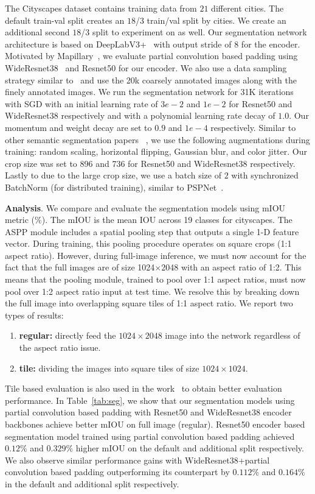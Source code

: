\documentclass[10pt,twocolumn,letterpaper]{article}
\begin{document}
The Cityscapes dataset contains training data from $21$ different cities. The default train-val split creates an $18$/$3$ train/val split by cities. We create an additional second $18$/$3$ split to experiment on as well. Our segmentation network architecture is based on DeepLabV3+~\cite{chen2018encoder} with output stride of $8$ for the encoder. Motivated by Mapillary~\cite{bulo2017place}, we evaluate partial convolution based padding using WideResnet38~\cite{wu2016wider} and Resnet50 for our encoder. We also use a data sampling strategy similar to~\cite{bulo2017place} and use the 20k coarsely annotated images along with the finely annotated images. We run the segmentation network for 31K iterations with SGD with an initial learning rate of $3e-2$ and $1e-2$ for Resnet50 and WideResnet38 respectively and with a polynomial learning rate decay of $1.0$. Our momentum and weight decay are set to $0.9$ and $1e-4$ respectively. Similar to other semantic segmentation papers ~\cite{zhao2017pyramid,zhang2018context,chen2018encoder}, we use the following augmentations during training: random scaling, horizontal flipping, Gaussian blur, and color jitter. Our crop size was set to 896 and 736 for Resnet50 and WideResnet38 respectively. Lastly to due to the large crop size, we use a batch size of $2$ with synchronized BatchNorm (for distributed training), similar to PSPNet~\cite{zhao2017pyramid}. 

\textbf{Analysis}.
We compare and evaluate the segmentation models using mIOU metric ($\%$). The mIOU is the mean IOU across 19 classes for cityscapes. 
The ASPP module includes a spatial pooling step that outputs a single 1-D feature vector. During training, this pooling procedure operates on square crops (1:1 aspect ratio). However, during full-image inference, we must now account for the fact that the full images are of size 1024$\times$2048 with an aspect ratio of 1:2. This means that the pooling module, trained to pool over 1:1 aspect ratios, must now pool over 1:2 aspect ratio input at test time. We resolve this by breaking down the full image into overlapping square tiles of 1:1 aspect ratio. We report two types of results:
\begin{enumerate}
\item \textbf{regular:} directly feed the $1024 \times 2048$ image into the network regardless of the aspect ratio issue.
\item \textbf{tile:} dividing the images into square tiles of size $1024 \times 1024$.  
\end{enumerate}Tile based evaluation is also used in the work~\cite{zhao2017pyramid} to obtain better evaluation performance. In Table~\ref{tab:seg}, we show that our segmentation models using partial convolution based padding with Resnet50 and WideResnet38 encoder backbones achieve better mIOU on full image (regular). Resnet50 encoder based segmentation model trained using partial convolution based padding achieved $0.12\%$ and $0.329\%$ higher mIOU on the default and additional split respectively. We also observe similar performance gains with WideResnet38+partial convolution based padding outperforming its counterpart by $0.112\%$ and $0.164\%$ in the default and additional split respectively.  
\end{document}
